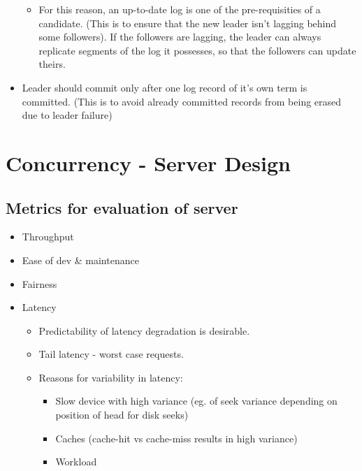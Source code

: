 \documentclass[a4paper]{article}
\begin{document}
\begin{itemize}
    \begin{itemize}
        \item
        For this reason, an up-to-date log is one of the pre-requisities of
        a candidate. (This is to ensure that the new leader isn't lagging
        behind some followers). If the followers are lagging, the leader can
        always replicate segments of the log it possesses, so that the
        followers can update theirs.
    \end{itemize}
\item
    Leader should commit only after one log record of it's own term is
    committed. (This is to avoid already committed records from being
    erased due to leader failure)
\end{itemize}

\newpage

\section{Concurrency - Server Design}

\subsection{Metrics for evaluation of server}

\begin{itemize}
\item
    Throughput
\item
    Ease of dev \& maintenance
\item
    Fairness
\item
    Latency

    \begin{itemize}
        \item
        Predictability of latency degradation is desirable.
    \item
        Tail latency - worst case requests.
    \item
        Reasons for variability in latency:

        \begin{itemize}
                \item
            Slow device with high variance (eg. of seek variance depending on
            position of head for disk seeks)
        \item
            Caches (cache-hit vs cache-miss results in high variance)
        \item
            Workload
        \end{itemize}
    \end{itemize}
\end{itemize}
\end{document}
